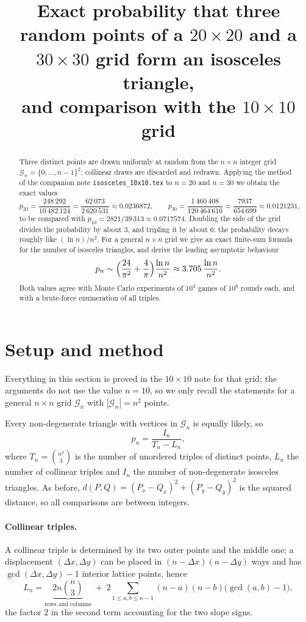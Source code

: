\documentclass[11pt,a4paper]{article}
\title{Exact probability that three random points of a $20\times 20$ and a
$30\times30$ grid form an isosceles triangle,\\ and comparison with the
$10\times10$ grid}
\author{}
\date{}
\theoremstyle{remark}
\newcommand{\G}{\mathcal{G}}
\begin{document}
\maketitle

\begin{abstract}
Three distinct points are drawn uniformly at random from the $n\times n$ integer
grid $\G_n=\{0,\dots,n-1\}^2$; collinear draws are discarded and redrawn.
Applying the method of the companion note \texttt{isosceles\_10x10.tex} to
$n=20$ and $n=30$ we obtain the exact values
\[
  p_{20}=\frac{248\,292}{10\,482\,124}=\frac{62\,073}{2\,620\,531}\approx0.0236872,
  \qquad
  p_{30}=\frac{1\,460\,408}{120\,464\,616}=\frac{7937}{654\,699}\approx0.0121231,
\]
to be compared with $p_{10}=2821/39\,313\approx0.0717574$. Doubling the side of the
grid divides the probability by about $3$, and tripling it by about $6$: the
probability decays roughly like $(\ln n)/n^2$. For a general $n\times n$ grid we
give an exact finite-sum formula for the number of isosceles triangles, and
derive the leading asymptotic behaviour
\[
  p_n\sim\Bigl(\frac{24}{\pi^2}+\frac4\pi\Bigr)\frac{\ln n}{n^2}
  \approx3.705\,\frac{\ln n}{n^2}.
\]
Both values agree with Monte Carlo
experiments of $10^4$ games of $10^6$ rounds each, and with a brute-force
enumeration of all triples.
\end{abstract}

\section{Setup and method}

Everything in this section is proved in the $10\times10$ note for that grid; the
arguments do not use the value $n=10$, so we only recall the statements for a
general $n\times n$ grid $\G_n$ with $|\G_n|=n^2$ points.

Every non-degenerate triangle with vertices in $\G_n$ is equally likely, so
\begin{equation}\label{eq:p}
  p_n=\frac{I_n}{T_n-L_n},
\end{equation}
where $T_n=\binom{n^2}{3}$ is the number of unordered triples of distinct points,
$L_n$ the number of collinear triples and $I_n$ the number of non-degenerate
isosceles triangles. As before, $d(P,Q)=(P_x-Q_x)^2+(P_y-Q_y)^2$ is the squared
distance, so all comparisons are between integers.

\paragraph{Collinear triples.} A collinear triple is determined by its two outer
points and the middle one; a displacement $(\Delta x,\Delta y)$ can be placed in
$(n-\Delta x)(n-\Delta y)$ ways and has $\gcd(\Delta x,\Delta y)-1$ interior lattice
points, hence
\begin{equation}\label{eq:L}
  L_n=\underbrace{2n\binom{n}{3}}_{\text{rows and columns}}
  \;+\;2\!\!\sum_{1\le a,b\le n-1}\!\!(n-a)(n-b)\bigl(\gcd(a,b)-1\bigr),
\end{equation}
the factor $2$ in the second term accounting for the two slope signs.
\end{document}
